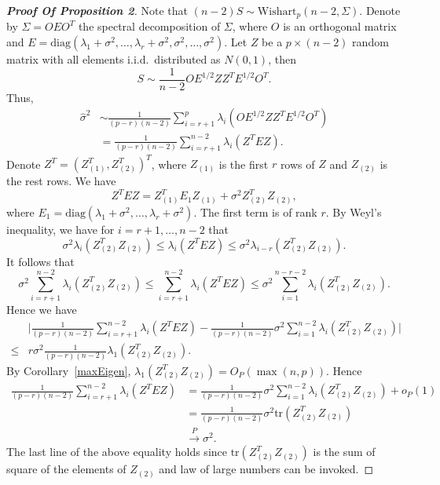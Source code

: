 
\begin{proof}[\textbf{Proof Of Proposition 2}]
    Note that $(n-2)S\sim \mathrm{Wishart}_p (n-2,\Sigma)$.
    Denote by $\Sigma=OEO^T$ the spectral decomposition of $\Sigma$, where $O$ is an orthogonal matrix and $E=\mathrm{diag}(\lambda_1+\sigma^2,\ldots,\lambda_r+\sigma^2,\sigma^2,\ldots,\sigma^2)$.
    Let $Z$ be a $p\times (n-2)$ random matrix with all elements i.i.d.\ distributed as $N(0,1)$, then
    $$
        S\sim \frac{1}{n-2} O E^{1/2} Z Z^T E^{1/2} O^T.
    $$
    Thus,
    \begin{equation*}
        \begin{aligned}
            \hat{\sigma}^2&\sim
            \frac{1}{(p-r)(n-2)}\sum_{i=r+1}^p \lambda_i (O E^{1/2} Z Z^T E^{1/2} O^T)\\
            &=
            \frac{1}{(p-r)(n-2)}\sum_{i=r+1}^{n-2} \lambda_i ( Z^T E Z).
        \end{aligned}
    \end{equation*}
    Denote $Z^T={(Z_{(1)}^T,Z_{(2)}^T)}^T$, where $Z_{(1)}$ is the first $r$ rows of $Z$ and $Z_{(2)}$ is the rest rows. We have
    $$
    Z^T E Z =Z_{(1)}^T E_1 Z_{(1)}+\sigma^2 Z_{(2)}^T Z_{(2)},
    $$
    where $E_1=\mathrm{diag}(\lambda_1+\sigma^2,\ldots,\lambda_r +\sigma^2)$. The first term is of rank $r$. By Weyl's inequality, we have for $i=r+1,\ldots, n-2$ that
    $$
    \sigma^2\lambda_i(Z_{(2)}^T Z_{(2)}) \leq \lambda_i(Z^T E Z)\leq
    \sigma^2\lambda_{i-r}(Z_{(2)}^T Z_{(2)}).
    $$
    It follows that
    $$
    \sigma^2\sum_{i=r+1}^{n-2}\lambda_i(Z_{(2)}^T Z_{(2)}) \leq \sum_{i=r+1}^{n-2}\lambda_i(Z^T E Z)\leq
    \sigma^2\sum_{i=1}^{n-r-2}\lambda_{i}(Z_{(2)}^T Z_{(2)}).
    $$
    Hence we have
     \begin{equation*}
         \begin{aligned}
             &\Big|\frac{1}{(p-r)(n-2)}\sum_{i=r+1}^{n-2}\lambda_i(Z^T E Z)-
    \frac{1}{(p-r)(n-2)} \sigma^2\sum_{i=1}^{n-2}\lambda_{i}(Z_{(2)}^T Z_{(2)})\Big|
             \\
             \leq & r\sigma^2\frac{1}{(p-r)(n-2)} \lambda_1 (Z_{(2)}^T Z_{(2)}).
         \end{aligned}
     \end{equation*}
    By Corollary~\ref{maxEigen}, $\lambda_1 (Z_{(2)}^T Z_{(2)})=O_P(\max(n,p))$. Hence
     \begin{equation*}
         \begin{aligned}
             \frac{1}{(p-r)(n-2)}\sum_{i=r+1}^{n-2}\lambda_i(Z^T E Z)
             &=
    \frac{1}{(p-r)(n-2)} \sigma^2\sum_{i=1}^{n-2}\lambda_{i}(Z_{(2)}^T Z_{(2)})
             +o_P(1)\\
             &=
             \frac{1}{(p-r)(n-2)} \sigma^2\mathrm{tr}(Z_{(2)}^T Z_{(2)})\\
             &\xrightarrow{P}
             \sigma^2.
         \end{aligned}
     \end{equation*}
     The last line of the above equality holds since $\mathrm{tr}(Z_{(2)}^T Z_{(2)})$ is the sum of square of the elements of $Z_{(2)}$ and law of large numbers can be invoked.



\end{proof}
